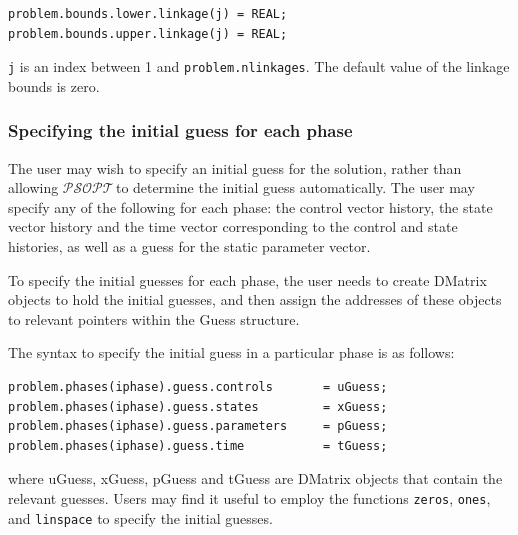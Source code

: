 \documentclass[a4paper,11pt]{report}    %
\newcommand{\psopt}{$\mathcal{PSOPT}$\,}  %
\begin{document}
\begin{verbatim}
problem.bounds.lower.linkage(j) = REAL;
problem.bounds.upper.linkage(j) = REAL;
\end{verbatim}

\noindent \texttt{j} is an index
between 1 and \texttt{problem.nlinkages}. The default value of the linkage  bounds is zero.


\subsubsection{Specifying the initial guess for each phase}

The user may wish to specify an initial guess for the solution, rather
than allowing \psopt to determine the initial guess automatically. 
The user may specify any of the following for each phase: 
the control vector history, the state vector history and 
the time vector corresponding to the control and state histories, 
as well as a guess for the static parameter vector.

To specify the initial guesses for each phase, the user needs to create
DMatrix objects to hold the initial guesses, and then assign the
addresses of these objects to relevant pointers within the Guess
structure.

The syntax to  specify the initial guess in a particular phase
is as follows:

\begin{verbatim}
problem.phases(iphase).guess.controls       = uGuess;
problem.phases(iphase).guess.states         = xGuess;
problem.phases(iphase).guess.parameters     = pGuess;
problem.phases(iphase).guess.time           = tGuess;
\end{verbatim}

\noindent where uGuess, xGuess, pGuess and tGuess are  DMatrix objects that contain the relevant
guesses. Users may find it useful to employ the functions \texttt{zeros},
\texttt{ones}, and \texttt{linspace} to specify the initial guesses.
\end{document}
